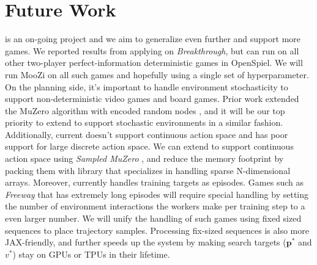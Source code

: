 \chapter{Future Work}
\moozi is an on-going project and we aim to generalize \moozi even further and support more games.
We reported results from applying \moozi on \textit{Breakthrough}, but \moozi can run on all other two-player perfect-information deterministic games in OpenSpiel.
We will run MooZi on all such games and hopefully using a single set of hyperparameter.
On the planning side, it's important to handle environment stochasticity to support non-deterministic video games and board games.
Prior work extended the MuZero algorithm with encoded random nodes \cite{VectorQuantizedModels_Ozair.Li.ea_2021,PLANNINGSTOCHASTICENVIRONMENTS_Antonoglou.Schrittwieser.ea_2022}, and it will be our top priority to extend \moozi to support stochastic environments in a similar fashion.
Additionally, \moozi current doesn't support continuous action space and has poor support for large discrete action space.
We can extend \moozi to support continuous action space using \textit{Sampled MuZero} \cite{LearningPlanningComplex_Hubert.Schrittwieser.ea_2021}, and reduce the memory footprint by packing them with library that specializes in handling sparse N-dimensional arrays.
Moreover, \moozi currently handles training targets as episodes.
Games such as \textit{Freeway} that has extremely long episodes will require special handling by setting the number of environment interactions the workers make per training step to a even larger number.
We will unify the handling of such games using fixed sized sequences to place trajectory samples.
Processing fix-sized sequences is also more JAX-friendly, and further speeds up the system by making search targets (\(\mathbf{p}^{*}\) and $v^{*}$) stay on GPUs or TPUs in their lifetime.


